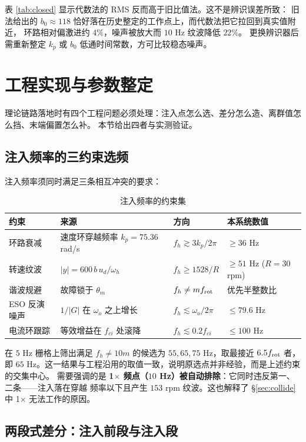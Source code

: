 \documentclass[11pt,a4paper]{ctexart}
\begin{document}
表 \ref{tab:closed} 显示代数法的 RMS 反而高于旧比值法。这不是辨识误差所致：
旧法给出的 $b_0\approx118$ 恰好落在历史整定的工作点上，而代数法把它拉回到真实值附近，
环路相对偏激进约 $4\%$，噪声被放大而 $10$ Hz 纹波降低 $22\%$。
更换辨识器后需重新整定 $k_p$ 或 $b_0$ 低通时间常数，方可比较稳态噪声。

\section{工程实现与参数整定}
\label{sec:impl}

理论链路落地时有四个工程问题必须处理：注入点怎么选、差分怎么造、离群值怎么挡、末端偏置怎么补。
本节给出四者与实测验证。

\subsection{注入频率的三约束选频}

注入频率须同时满足三条相互冲突的要求：

\begin{table}[H]
\centering
\caption{注入频率的约束集}
\label{tab:sel}
\begin{tabular}{llll}
\toprule
约束 & 来源 & 方向 & 本系统数值 \\
\midrule
环路衰减 & 速度环穿越频率 $k_p=75.36$ rad/s & $f_h\gtrsim 3k_p/2\pi$ & $\ge 36$ Hz\\
转速纹波 & $|y|=600\,b\,u_d/\omega_h$ & $f_h\ge 1528/R$ & $\ge 51$ Hz ($R{=}30$ rpm)\\
谐波规避 & 故障锁于 $\theta_m$ & $f_h\neq m f_{\rm rot}$ & 优先半整数比\\
ESO 反演噪声 & $1/|G|$ 在 $\omega_o$ 之上增长 & $f_h\lesssim\omega_o/2\pi$ & $\le 79.6$ Hz\\
电流环跟踪 & 等效增益在 $f_{ci}$ 处滚降 & $f_h\lesssim 0.2f_{ci}$ & $\le 100$ Hz\\
\bottomrule
\end{tabular}
\end{table}

在 $5$ Hz 栅格上筛出满足 $f_h\neq 10m$ 的候选为 $55,65,75$ Hz，取最接近 $6.5f_{\rm rot}$ 者，即
$65$ Hz。这一结果与工程沿用的取值一致，说明原选点并非经验，而是上述约束的交集中心。
需要强调的是 \textbf{1$\times$ 频点（$10$ Hz）被自动排除}：它同时违反第一、二条——注入落在穿越
频率以下且产生 $153$ rpm 纹波。这也解释了 \S\ref{sec:collide} 中 1$\times$ 无法工作的原因。

\subsection{两段式差分：注入前段与注入段}
\end{document}
